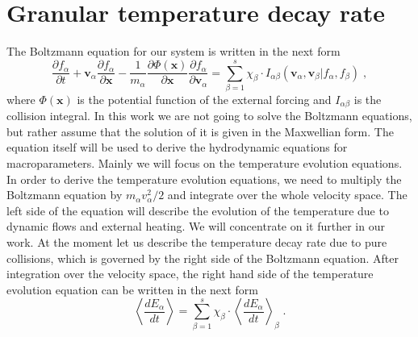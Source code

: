 \documentclass[preprint, aps, pra]{revtex4-1}
\newcommand{\ab}{{\alpha\beta}}
\newcommand{\bx}{{\bm{x}}}
\newcommand{\bv}{{\bm{v}}}
\newcommand{\pd}{\partial}
\begin{document}
\section{Granular temperature decay rate}
The Boltzmann equation for our system is written in the next form 
\begin{equation}
  \frac{\pd f_\alpha}{\pd t}+\bv_\alpha\frac{\pd f_\alpha}{\pd\bx}-\frac{1}{m_\alpha}\frac{\pd\Phi(\bx)}{\pd\bx}\frac{\pd f_\alpha}{\pd\bv_\alpha}=
  \sum_{\beta=1}^{s}\chi_\beta\cdot I_\ab(\bv_\alpha,\bv_\beta\vert f_\alpha,f_\beta)\;,
\end{equation}
where $\Phi(\bx)$ is the potential function of the external forcing and $I_\ab$ is the collision integral. In this work we are not going to 
solve the Boltzmann equations, but rather assume that the solution of it is given in the Maxwellian form. The equation itself will be used
to derive the hydrodynamic equations for macroparameters. Mainly we will focus on the temperature evolution equations. In order to derive
the temperature evolution equations, we need to multiply the Boltzmann equation by $m_\alpha v_\alpha^2/2$ and integrate over the whole 
velocity space. The left side of the equation will describe the evolution of the temperature due to dynamic flows and external heating. We will
concentrate on it further in our work. At the moment let us describe the temperature decay rate due to pure collisions, which is governed
by the right side of the Boltzmann equation. After integration over the velocity space, the right hand side of the temperature evolution 
equation can be written in the next form
\begin{equation}
  \left\langle\frac{dE_\alpha}{dt}\right\rangle = \sum_{\beta=1}^{s}\chi_\beta\cdot\left\langle\frac{d E_\alpha}{dt}\right\rangle_\beta\;.
\end{equation}
\end{document}
